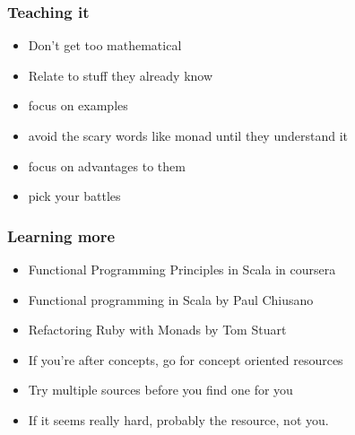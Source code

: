 \documentclass{beamer}
\begin{document}
\begin{frame}
\frametitle{Teaching it}
\begin{itemize}
\item Don't get too mathematical
\item Relate to stuff they already know
\item focus on examples
\item avoid the scary words like monad until they understand it
\item focus on advantages to them
\item pick your battles
\end{itemize}
\end{frame}

\begin{frame}
\frametitle{Learning more}
\begin{itemize}
\item Functional Programming Principles in Scala in coursera
\item Functional programming in Scala by Paul Chiusano
\item Refactoring Ruby with Monads by Tom Stuart
\item If you're after concepts, go for concept oriented resources
\item Try multiple sources before you find one for you
\item If it seems really hard, probably the resource, not you.
\end{itemize}
\end{frame}
\end{document}
